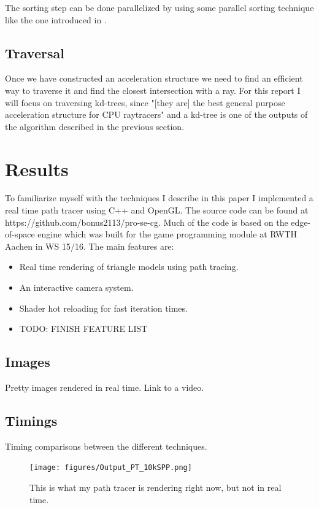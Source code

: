\documentclass{ACGSeminar}
\begin{document}
The sorting step can be done parallelized by using some parallel sorting technique like the one introduced in \cite{Merrill:2010:RSG:1854273.1854344}.

\subsection{Traversal}
Once we have constructed an acceleration structure we need to find an efficient way to traverse it and find the closest intersection with a ray. For this report I will focus on traversing kd-trees, since "[they are] the best general purpose acceleration structure for CPU raytracers" \cite{Foley:2005} and a kd-tree is one of the outputs of the algorithm described in the previous section.


\section{Results} \label{results}
To familiarize myself with the techniques I describe in this paper I implemented a real time path tracer using C++ and OpenGL. The source code can be found at https://github.com/bonus2113/pro-se-cg.
Much of the code is based on the edge-of-space engine \cite{edge_of_space} which was built for the game programming module at RWTH Aachen in WS 15/16.
The main features are:
\begin{itemize}
\item Real time rendering of triangle models using path tracing.
\item An interactive camera system.
\item Shader hot reloading for fast iteration times.
\item TODO: FINISH FEATURE LIST
\end{itemize}

\subsection{Images}
Pretty images rendered in real time. Link to a video.
\subsection{Timings}
Timing comparisons between the different techniques.

\begin{figure}[htb!]
  \begin{centering}
    \texttt{[image: figures/Output\_PT\_10kSPP.png]}\par
  \end{centering}
  \caption{This is what my path tracer is rendering right now, but not in real time.}
  \label{fig:pathtraced}
\end{figure}


\printbibliography
\end{document}
